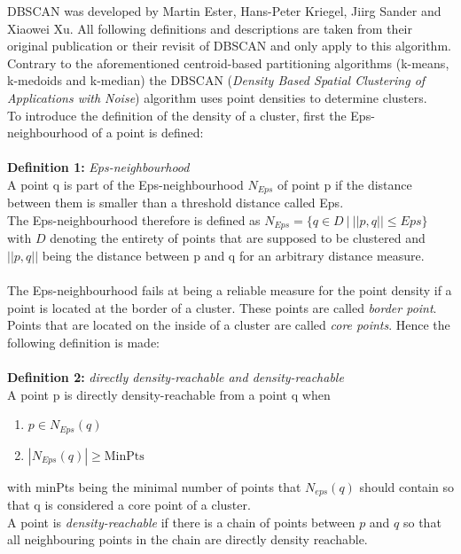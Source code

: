 
DBSCAN was developed by Martin Ester, Hans-Peter Kriegel, Jiirg Sander and Xiaowei Xu. All following definitions and descriptions are taken from their original publication \cite{dbscan} or their revisit of DBSCAN \cite{dbscanrevisited} and only apply to this algorithm.\\
Contrary to the aforementioned centroid-based partitioning algorithms (k-means, k-medoids and k-median) the DBSCAN (\textit{Density Based Spatial Clustering of Applications with Noise}) algorithm uses point densities to determine clusters.\\
To introduce the definition of the density of a cluster, first the Eps-neighbourhood of a point is defined:\\
\ \\
\textbf{Definition 1:} \textit{Eps-neighbourhood}\\
A point q is part of the Eps-neighbourhood $N_{Eps}$ of point p if the distance between them is smaller than a threshold distance called Eps.\\
The Eps-neighbourhood therefore is defined as $N_{Eps} = \{q \in D \ | \ ||p, q|| \leq Eps \}$ with $D$ denoting the entirety of points that are supposed to be clustered and $||p, q||$ being the distance between p and q for an arbitrary distance measure.\\
\ \\
The Eps-neighbourhood fails at being a reliable measure for the point density if a point is located at the border of a cluster. These points are called \textit{border point}. Points that are located on the inside of a cluster are called \textit{core points}. Hence the following definition is made:\\
\ \\
\textbf{Definition 2:} \textit{directly density-reachable and density-reachable}\\
A point p is directly density-reachable from a point q when
\begin{enumerate}
    \item $p \in N_{Eps}(q)$
    \item $|N_{Eps}(q)| \geq \text{MinPts}$
\end{enumerate}
with \acrshort{minPts} being the minimal number of points that $N_{eps}(q)$ should contain so that q is considered a core point of a cluster.\\
A point is \textit{density-reachable} if there is a chain of points between $p$ and $q$ so that all neighbouring points in the chain are directly density reachable.\\

